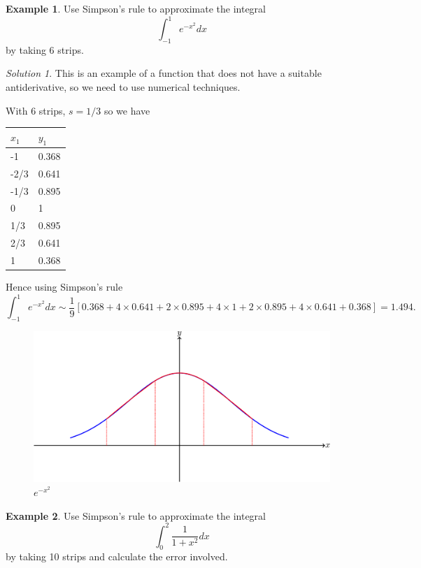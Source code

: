 \documentclass[
  11pt,
  oneside]{book}
\newcommand{\slide}{}
\theoremstyle{definition}
\theoremstyle{definition}
\newtheorem{example}{Example}[chapter]
\theoremstyle{definition}
\theoremstyle{definition}
\theoremstyle{remark}
\newtheorem*{solution}{Solution}
\begin{document}
\slide

\begin{example}
Use Simpson's rule to approximate the integral
\[
\int_{-1}^1e^{-x^2}dx
\]
by taking 6 strips.
\end{example}

\begin{solution}

This is an example of a function that does not have a suitable antiderivative, so we need to use numerical techniques.

With 6 strips, \(s=1/3\) so we have

\begin{tabular}{l|l}
\hline
$x_1$ & $y_1$\\
\hline
-1 & 0.368\\
\hline
-2/3 & 0.641\\
\hline
-1/3 & 0.895\\
\hline
0 & 1\\
\hline
1/3 & 0.895\\
\hline
2/3 & 0.641\\
\hline
1 & 0.368\\
\hline
\end{tabular}

Hence using Simpson's rule
\[
\int_{-1}^1e^{-x^2}dx \sim \frac19\left[0.368 + 4\times0.641+2\times0.895+4\times1+2\times0.895+4\times0.641+0.368\right] = 1.494.
\]

\begin{figure}

{\centering \includegraphics[width=0.5\linewidth]{tikztopng-figure31} 

}

\caption{$e^{-x^2}$}\label{fig:unnamed-chunk-57}
\end{figure}

\end{solution}

\slide

\begin{example}
Use Simpson's rule to approximate the integral
\[
\int_0^2\frac1{1+x^2}dx
\]
by taking 10 strips and calculate the error involved.
\end{example}
\end{document}
